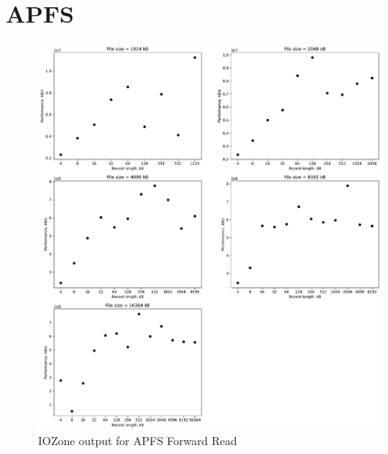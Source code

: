 \section{APFS}
\begin{figure}[!htb]
	\label{fig:app_bench_apfs_rnd_read}
	\begin{center}
		\includegraphics[width=1.0\textwidth]{figures/benchmarking/local/Reader.pdf}
	\end{center}
	\caption{IOZone output for APFS Forward Read}
\end{figure}

